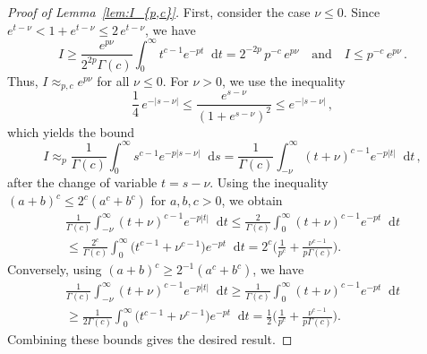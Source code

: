\documentclass[11pt]{amsart}
\theoremstyle{plain}
\theoremstyle{definition}
\newcommand		{\lt}			{\left}				%
\newcommand		{\rt}			{\right}			%
\renewcommand	{\(}			{\lt(}
\renewcommand	{\)}			{\rt)}
\newcommand		{\n}[1]			{\lt\lvert #1 \rt\rvert}
\renewcommand		{\d}		{\mathop{}\!\mathrm{d}}		%
\begin{document}
	\begin{proof}[Proof of Lemma~\ref{lem:I_{p,c}}]
		First, consider the case $\nu \le 0$. Since $e^{t-\nu} < 1 + e^{t-\nu} \le 2\, e^{t-\nu}$, we have
		\begin{equation*}
			I \ge \frac{e^{p\nu}}{2^{2p}\Gamma(c)} \int_0^{\infty} t^{c-1} e^{-pt} \d t = 2^{-2p}\, p^{-c}\, e^{p\nu}
			\quad \text{and} \quad
			I \le p^{-c}\, e^{p\nu} \,.
		\end{equation*}
		Thus, $I \approx_{p, c} e^{p\nu}$ for all $\nu \le 0$. For $\nu > 0$, we use the inequality
		\begin{equation*}
			\frac14 \, e^{-\n{s-\nu}} \le \frac{e^{s-\nu}}{(1+e^{s-\nu})^{2}} \le e^{-\n{s-\nu}} \,,
		\end{equation*}
		which yields the bound
		\begin{equation*}
			I \approx_{p} \frac{1}{\Gamma(c)} \int_0^{\infty} s^{c-1} e^{-p\n{s-\nu}} \d s
			= \frac{1}{\Gamma(c)} \int_{-\nu}^{\infty} (t+\nu)^{c-1} e^{-p\n{t}} \d t \, ,
		\end{equation*}
		after the change of variable $t = s - \nu$. Using the inequality $(a+b)^c \le 2^c \lt(a^c + b^c\rt)$ for $a,b,c > 0$, we obtain
		\begin{multline*}
			\frac{1}{\Gamma(c)} \int_{-\nu}^{\infty} (t+\nu)^{c-1} e^{-p\n{t}} \d t
			\le \frac{2}{\Gamma(c)} \int_0^{\infty} (t+\nu)^{c-1} e^{-pt} \d t
			\\
			\le \frac{2^c}{\Gamma(c)} \int_0^{\infty} \bigl(t^{c-1} + \nu^{c-1}\bigr) e^{-pt} \d t = 2^c \biggl( \frac{1}{p^c} + \frac{\nu^{c-1}}{p\Gamma(c)} \biggr).
		\end{multline*}
		Conversely, using $(a+b)^c \ge 2^{-1}(a^c + b^c)$, we have
		\begin{multline*}
			\frac{1}{\Gamma(c)} \int_{-\nu}^{\infty} (t+\nu)^{c-1} e^{-p\n{t}} \d t
			\ge \frac{1}{\Gamma(c)} \int_0^{\infty} (t+\nu)^{c-1} e^{-pt} \d t \\
			\ge \frac{1}{2\Gamma(c)} \int_0^{\infty} \bigl(t^{c-1} + \nu^{c-1}\bigr) e^{-pt} \d t = \frac{1}{2} \biggl( \frac{1}{p^c} + \frac{\nu^{c-1}}{p\Gamma(c)} \biggr).
		\end{multline*}
		Combining these bounds gives the desired result.
	\end{proof}
	
\end{document}
